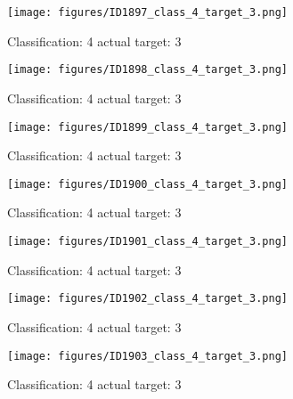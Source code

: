 \begin{figure}[h!]
\begin{center}
\texttt{[image: figures/ID1897\_class\_4\_target\_3.png]}
\end{center}
\caption{ Classification: 4 actual target: 3}
\label{fig:ID1897_class_4_target_3}
\end{figure}
\begin{figure}[h!]
\begin{center}
\texttt{[image: figures/ID1898\_class\_4\_target\_3.png]}
\end{center}
\caption{ Classification: 4 actual target: 3}
\label{fig:ID1898_class_4_target_3}
\end{figure}
\begin{figure}[h!]
\begin{center}
\texttt{[image: figures/ID1899\_class\_4\_target\_3.png]}
\end{center}
\caption{ Classification: 4 actual target: 3}
\label{fig:ID1899_class_4_target_3}
\end{figure}
\begin{figure}[h!]
\begin{center}
\texttt{[image: figures/ID1900\_class\_4\_target\_3.png]}
\end{center}
\caption{ Classification: 4 actual target: 3}
\label{fig:ID1900_class_4_target_3}
\end{figure}
\begin{figure}[h!]
\begin{center}
\texttt{[image: figures/ID1901\_class\_4\_target\_3.png]}
\end{center}
\caption{ Classification: 4 actual target: 3}
\label{fig:ID1901_class_4_target_3}
\end{figure}
\begin{figure}[h!]
\begin{center}
\texttt{[image: figures/ID1902\_class\_4\_target\_3.png]}
\end{center}
\caption{ Classification: 4 actual target: 3}
\label{fig:ID1902_class_4_target_3}
\end{figure}
\begin{figure}[h!]
\begin{center}
\texttt{[image: figures/ID1903\_class\_4\_target\_3.png]}
\end{center}
\caption{ Classification: 4 actual target: 3}
\label{fig:ID1903_class_4_target_3}
\end{figure}

